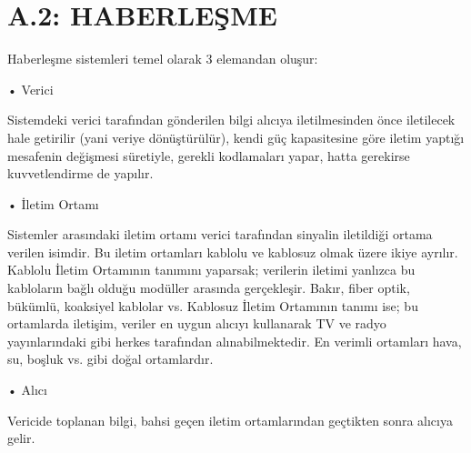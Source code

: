 \clearpage
\section{A.2: HABERLEŞME }
\label{CH:AltBolum1.2}

Haberleşme sistemleri temel olarak 3 elemandan oluşur:

• Verici

	Sistemdeki verici tarafından gönderilen bilgi alıcıya iletilmesinden önce iletilecek hale getirilir (yani veriye dönüştürülür), kendi güç kapasitesine göre iletim yaptığı mesafenin değişmesi süretiyle, gerekli kodlamaları yapar, hatta gerekirse kuvvetlendirme de yapılır.  
    
• İletim Ortamı 

	Sistemler arasındaki iletim ortamı verici tarafından sinyalin iletildiği ortama verilen isimdir. Bu iletim ortamları kablolu ve kablosuz olmak üzere ikiye ayrılır. Kablolu İletim Ortamının tanımını yaparsak; verilerin iletimi yanlızca bu kabloların bağlı olduğu modüller arasında gerçekleşir. Bakır, fiber optik, bükümlü, koaksiyel  kablolar vs. Kablosuz İletim Ortamının tanımı ise; bu ortamlarda iletişim, veriler en uygun alıcıyı kullanarak TV ve radyo yayınlarındaki gibi herkes tarafından alınabilmektedir. En verimli ortamları hava, su, boşluk vs. gibi doğal ortamlardır.  
    
• Alıcı 

	Vericide toplanan bilgi, bahsi geçen iletim ortamlarından geçtikten sonra alıcıya gelir. 
